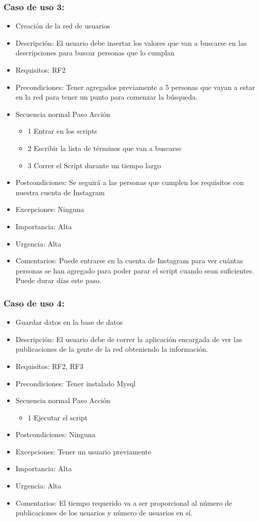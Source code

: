 \subsubsection{Caso de uso 3:}
\begin{itemize}
\item Creación de la red de usuarios
\item Descripción: El usuario debe insertar los valores que van a buscarse en las descripciones para buscar personas que lo cumplan
\item Requisitos: RF2
\item Precondiciones: Tener agregados previamente a 5 personas que vayan a estar en la red para tener un punto para comenzar la búsqueda.
\item Secuencia normal 	Paso	 Acción
\begin{itemize}
    \item 1	Entrar en los scripts 
    \item 2	Escribir la lista de términos que van a buscarse
    \item 3	Correr el Script durante un tiempo largo
\end{itemize}
\item Postcondiciones: Se seguirá a las personas que cumplen los requisitos con nuestra cuenta de Instagram
\item Excepciones: Ninguna
\item Importancia: Alta
\item Urgencia: Alta
\item Comentarios: Puede entrarse en la cuenta de Instagram para ver cuántas personas se han agregado para poder parar el script cuando sean suficientes. Puede durar días este paso.
\end{itemize}


\subsubsection{Caso de uso 4:}
\begin{itemize}
\item Guardar datos en la base de datos
\item Descripción: El usuario debe de correr la aplicación encargada de ver las publicaciones de la gente de la red obteniendo la información.
\item Requisitos: RF2, RF3
\item Precondiciones: Tener instalado Mysql
\item Secuencia normal 	Paso	 Acción
\begin{itemize}
    \item 1	Ejecutar el script
\end{itemize}
\item Postcondiciones: Ninguna
\item Excepciones: Tener un usuario previamente
\item Importancia: Alta
\item Urgencia: Alta
\item Comentarios: El tiempo requerido va a ser proporcional al número de publicaciones de los usuarios y número de usuarios en sí.
\end{itemize}


